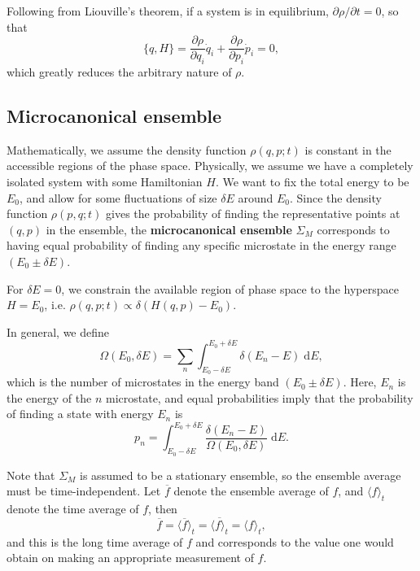 \documentclass[letter-paper]{tufte-book}
\newenvironment{example}[1][Example]{\begin{trivlist}
\item[\hskip \labelsep {\bfseries #1}]}{\end{trivlist}}
\newcommand\Def[1]{\textbf{#1}}
\begin{document}
Following from Liouville's theorem, if a system is in equilibrium, $\partial
\rho / \partial t = 0$, so that
\begin{equation*}
  \{q, H\} = \frac{\partial \rho}{\partial q_i} \dot{q}_i + \frac{\partial \rho}{\partial p_i} \dot{p}_i = 0,
\end{equation*}
which greatly reduces the arbitrary nature of $\rho$.


\subsection{Microcanonical ensemble}

Mathematically, we assume the density function $\rho(q,p;t)$ is constant in the
accessible regions of the phase space. Physically, we assume we have a
completely isolated system with some Hamiltonian $H$. We want to fix the total
energy to be $E_0$, and allow for some fluctuations of size $\delta E$ around
$E_0$. Since the density function $\rho(p,q;t)$ gives the probability of finding
the representative points at $(q,p)$ in the ensemble, the \Def{microcanonical
ensemble} $\Sigma_{M}$ corresponds to having equal probability of finding any
specific microstate in the energy range $(E_0 \pm \delta E)$.

\begin{example}
  For $\delta E =0 $, we constrain the available region of phase space to the
  hyperspace $H = E_0$, i.e. $\rho(q,p;t) \propto \delta (H(q,p) - E_0)$.
\end{example}

In general, we define
\begin{equation}
  \Omega(E_0, \delta E) = \sum_n \int^{E_0 + \delta E}_{E_0 - \delta E} \delta(E_n - E)\; \mathrm{d}E,
\end{equation}
which is the number of microstates in the energy band $(E_0 \pm \delta E)$.
Here, $E_n$ is the energy of the $n$ microstate, and equal probabilities imply
that the probability of finding a state with energy $E_n$ is
\begin{equation*}
  p_n = \int^{E_0 + \delta E}_{E_0 - \delta E} \frac{\delta (E_n - E)}{\Omega(E_0, \delta E)}\; \mathrm{d}E.
\end{equation*}

Note that $\Sigma_M$ is assumed to be a stationary ensemble, so the ensemble
average must be time-independent. Let $\overline{f}$ denote the ensemble average
of $f$, and $\langle f\rangle_t$ denote the time average of $f$, then
\begin{equation*}
  \overline{f} = \langle \overline{f}\rangle_t = \overline{\langle f\rangle_t} = \langle f\rangle_t,
\end{equation*}
and this is the long time average of $f$ and corresponds to the value one would
obtain on making an appropriate measurement of $f$.
\end{document}
